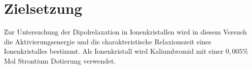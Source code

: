 \section{Zielsetzung}
\label{sec:zielsetzung}
Zur Untersuchung der Dipolrelaxation in Ionenkristallen wird in diesem Versuch die Aktivierungsenergie 
und die charakteristische Relaxionszeit eines Ionenkristalles bestimmt.
Als Ionenkristall wird Kaliumbromid mit einer $0,005 \%$ Mol Strontium Dotierung verwendet. 
